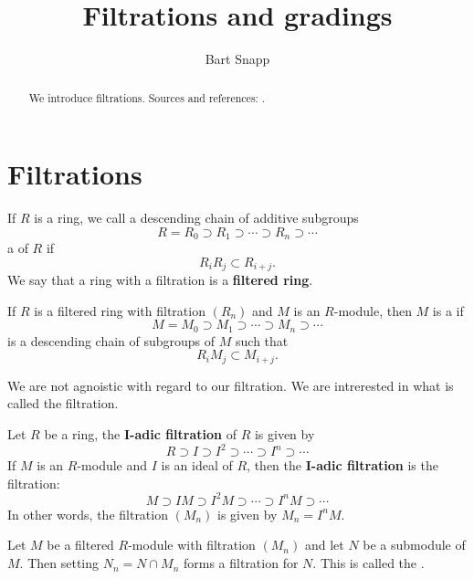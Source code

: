 \documentclass{ximera}
\author{Bart Snapp}
\title{Filtrations and gradings}
\begin{document}
\begin{abstract}
  We introduce filtrations. Sources and
  references: \cite{sD2008,jpS2000}.
\end{abstract}
\maketitle


\section{Filtrations}


\begin{definition}
  If $R$ is a ring, we call a descending chain of additive subgroups
  \[
  R = R_0 \supset R_1\supset \cdots \supset R_n\supset \cdots
  \]
  a  of $R$ if 
  \[
  R_i R_j \subset R_{i+j}.
  \]
  We say that a ring with a filtration is a \textbf{filtered ring}.
\end{definition}



\begin{definition}
  If $R$ is a filtered ring with filtration $(R_n)$ and $M$ is an
  $R$-module, then $M$ is a  if
  \[
  M = M_0  \supset M_1\supset \cdots \supset M_n\supset \cdots
  \]
  is a descending chain of subgroups of $M$ such that 
  \[
  R_i M_j \subset M_{i+j}.
  \]
\end{definition}


We are not agnoistic with regard to our filtration. We are intrerested
in what is called the  filtration.

\begin{definition}
  Let $R$ be a ring, the \textbf{$\boldsymbol{I}$-adic filtration} of
  $R$ is given by
  \[
  R \supset I \supset I^2 \supset \cdots \supset I^n \supset \cdots
  \]
  If $M$ is an $R$-module and $I$ is an ideal of $R$, then the
  \textbf{$\boldsymbol{I}$-adic filtration} is the filtration:
  \[
  M \supset  I M \supset I^2 M \supset \cdots  \supset  I^n M \supset \cdots 
  \]
In other words, the filtration $(M_n)$ is given by $M_n = I^n M$.
\end{definition}



 
\begin{definition}
  Let $M$ be a filtered $R$-module with filtration $(M_n)$ and let $N$
  be a submodule of $M$. Then setting $N_n= N\cap M_n$ forms a
  filtration for $N$. This is called the .
\end{definition}
\end{document}
